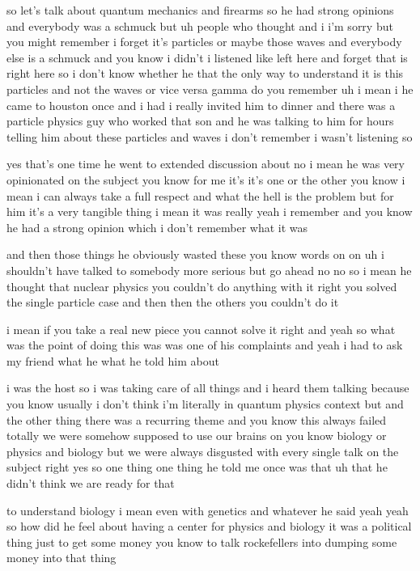 \begin{description}
so let's talk about quantum mechanics and firearms so he had strong opinions and everybody was a schmuck but uh people who thought and i i'm sorry but you might remember i forget it's particles or maybe those waves and everybody else is a schmuck and you know i didn't i listened like left here and forget that is right here so i don't know whether he that the only way to understand it is this particles and not the waves or vice versa gamma do you remember uh i mean i he came to houston once and i had i really invited him to dinner and there was a particle physics guy who worked that son and he was talking to him for hours telling him about these particles and waves i don't remember i wasn't listening so

yes that's one time he went to extended discussion about no i mean he was very opinionated on the subject you know for me it's it's one or the other you know i mean i can always take a full respect and what the hell is the problem but for him it's a very tangible thing i mean it was really yeah i remember and you know he had a strong opinion which i don't remember what it was

and then those things he obviously wasted these you know words on on uh i shouldn't have talked to somebody more serious but go ahead no no so i mean he thought that nuclear physics you couldn't do anything with it right you solved the single particle case and then then the others you couldn't do it

i mean if you take a real new piece you cannot solve it right and yeah so what was the point of doing this was was one of his complaints and yeah i had to ask my friend what he what he told him about

i was the host so i was taking care of all things and i heard them talking because you know usually i don't think i'm literally in quantum physics context but and the other thing there was a recurring theme and you know this always failed totally we were somehow supposed to use our brains on you know biology or physics and biology but we were always disgusted with every single talk on the subject right yes so one thing one thing he told me once was that uh that he didn't think we are ready for that

to understand biology i mean even with genetics and whatever he said yeah yeah so how did he feel about having a center for physics and biology it was a political thing just to get some money you know to talk rockefellers into dumping some money into that thing


\end{description}
